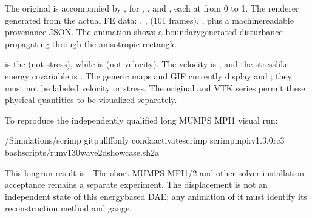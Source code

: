 \documentclass[letterpaper,10pt,english]{sphinxmanual}
\begin{document}
\sphinxAtStartPar
The original  is accompanied by
, for , ,  and ,
each at  from 0 to 1.
The renderer generated from the actual FE data:
,
,
 (101 frames),
, plus a
machine\sphinxhyphen{}readable provenance JSON. The animation
shows a boundary\sphinxhyphen{}generated disturbance
propagating through the anisotropic rectangle.

\sphinxAtStartPar
{}
 is the 
(not stress), while  is 
(not velocity). The velocity is ,
and the stress\sphinxhyphen{}like energy co\sphinxhyphen{}variable is
. The generic maps and GIF currently
display  and ; they must not be
labeled velocity or stress. The original
 and  VTK series permit these
physical quantities to be visualized separately.

\sphinxAtStartPar
To reproduce the independently qualified
long MUMPS MPI1 visual run:

\begin{sphinxVerbatim}[commandchars=\\\{\}]
\PYGZti{}/Simulations/scrimp
gitpull\PYGZhy{}\PYGZhy{}ff\PYGZhy{}only
condaactivatescrimp
scrimp\PYGZhy{}mpi:v1.3.0\PYGZhy{}rc3
bashscripts/run\PYGZhy{}v130\PYGZhy{}wave2d\PYGZhy{}showcase.sh2a
\end{sphinxVerbatim}

\sphinxAtStartPar
This long\sphinxhyphen{}run result is . The short
MUMPS MPI1/2 and other solver installation
acceptance remains a separate experiment.
The displacement  is not an independent
state of this energy\sphinxhyphen{}based DAE; any animation
of it must identify its reconstruction
method and gauge.
\end{document}
